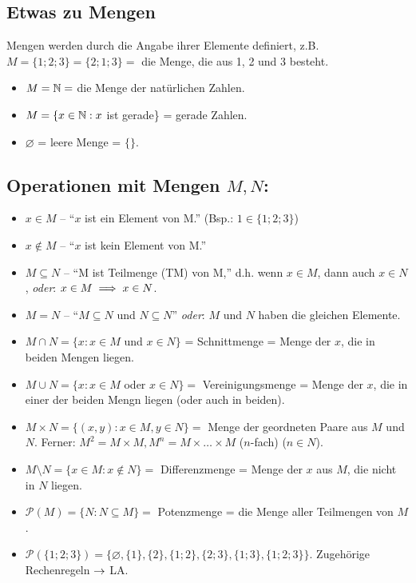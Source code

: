 \documentclass[12pt]{scrreprt}
\begin{document}
\subsection{Etwas zu Mengen}
Mengen werden durch die Angabe ihrer Elemente definiert, z.B. $M = \{1; 2; 3\} = \{2; 1; 3\} =$ die Menge, die aus 1, 2 und 3 besteht.
\begin{itemize}
\item $M = \mathbb{N} =$ die Menge der natürlichen Zahlen.
\item $M = \{x\in\mathbb{N}: x$ ist gerade\} = gerade Zahlen.
\item $\varnothing$ = leere Menge = $\{\}$.
\end{itemize}

\subsection{Operationen mit Mengen $M, N$:}
\begin{itemize}
\item $x \in M$ -- "`$x$ ist ein Element von M."' (Bsp.: $1 \in \{1; 2; 3\}$)
\item $x \notin M$ -- "`$x$ ist kein Element von M."'
\item $M \subseteq N$ -- "`M ist Teilmenge (TM) von M,"' d.h. wenn $x \in M$, dann auch $x \in N$, \textit{oder}: $x \in M \implies x \in N$.
\item $M = N$ -- "`$M \subseteq N$ und $N \subseteq N$"' \textit{oder}: $M$ und $N$ haben die gleichen Elemente.
\item $M \cap N = \{x: x \in M$ und $x \in N\}$ = Schnittmenge = Menge der $x$, die in beiden Mengen liegen.
\item $M \cup N = \{x: x \in M$ oder $x \in N\} =$ Vereinigungsmenge = Menge der $x$, die in einer der beiden Mengn liegen (oder auch in beiden).
\item $M \times N = \{(x,y): x \in M, y \in N\} =$ Menge der geordneten Paare aus $M$ und $N$. Ferner: $M^2 = M \times M, M^n = M \times \ldots \times M$ ($n$-fach) ($n \in N$).
\item $M \setminus N = \{x \in M: x \notin N\} =$ Differenzmenge = Menge der $x$ aus $M$, die nicht in $N$ liegen.
\item $\mathcal{P}(M) = \{N: N \subseteq M\} =$ Potenzmenge = die Menge aller Teilmengen von $M$.
\item $\mathcal{P}(\{1; 2; 3\}) = \{\varnothing, \{1\}, \{2\}, \{1; 2\}, \{2; 3\}, \{1; 3\}, \{1; 2; 3\}\}$. Zugehörige Rechenregeln $\rightarrow$ LA.
\end{itemize}
\end{document}
